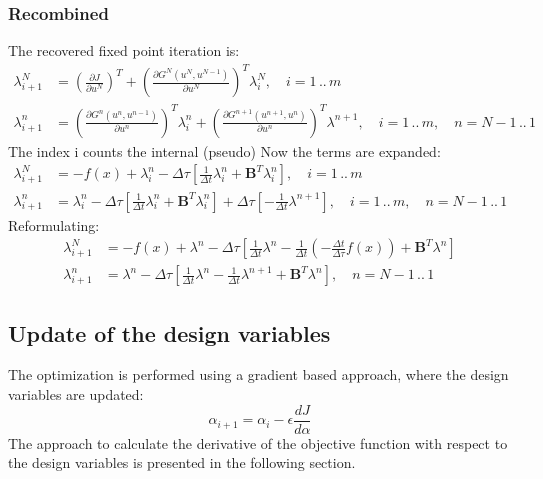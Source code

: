 \documentclass[10pt]{article}
\begin{document}
\subsubsection*{Recombined}
The recovered fixed point iteration is:
\begin{align}
\lambda^{N}_{i+1} &= \left( \frac{\partial J}{\partial u^N} \right)^T + \left( \frac{\partial G^N\left( u^N,u^{N-1} \right)}{\partial u^N}  \right)^T \lambda^N_i ,\quad i = 1\,..\,m \\
\lambda^{n}_{i+1} &=  \left( \frac{\partial G^n\left( u^n,u^{n-1} \right)}{\partial u^n}  \right)^T \lambda^n_i  +\left( \frac{\partial G^{n+1}\left( u^{n+1},u^{n} \right)}{\partial u^n}  \right)^T \lambda^{n+1} ,\quad i = 1\,..\,m,\quad n = N-1\,..\, 1
\end{align}
The index i counts the internal (pseudo) Now the terms are expanded:
\begin{align}
\lambda^{N}_{i+1} &= -f(x) + \lambda^n_i - \Delta\tau\left[ \frac{1}{\Delta t} \lambda^n_i + \mathbf{B}^T \lambda^n_i \right] ,\quad i = 1\,..\,m \\
\lambda^{n}_{i+1} &= \lambda^n_i - \Delta\tau\left[ \frac{1}{\Delta t} \lambda^n_i + \mathbf{B}^T \lambda^n_i \right] + \Delta\tau\left[ -\frac{1}{\Delta t} \lambda^{n+1} \right]  ,\quad i = 1\,..\,m ,\quad n = N-1\,..\, 1
\end{align}
Reformulating:
\begin{align}
\lambda^{N}_{i+1} &= -f(x) + \lambda^n - \Delta\tau\left[ \frac{1}{\Delta t} \lambda^n - \frac{1}{\Delta t} \left( - \frac{\Delta t}{\Delta\tau} f(x) \right) + \mathbf{B}^T \lambda^n \right]  \\
\lambda^{n}_{i+1} &= \lambda^n - \Delta\tau\left[ \frac{1}{\Delta t} \lambda^n - \frac{1}{\Delta t} \lambda^{n+1} + \mathbf{B}^T \lambda^n \right]  ,\quad n = N-1\,..\, 1
\end{align}
\subsection{Update of the design variables}
The optimization is performed using a gradient based approach, where the design variables are updated:
\begin{equation}
\alpha_{i+1} = \alpha_i - \epsilon \frac{d J}{d \alpha}
\end{equation}
The approach to calculate the derivative of the objective function with respect to the design variables is presented in the following section.
\end{document}
